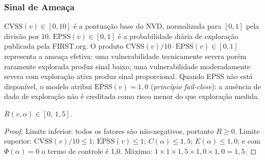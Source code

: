 \subsubsection{Sinal de Ameaça}

$\text{CVSS}(v) \in [0, 10]$ é a pontuação base do NVD, normalizada para
$[0,1]$ pela divisão por 10. $\text{EPSS}(v) \in [0, 1]$ é a probabilidade
diária de exploração publicada pela FIRST.org. O produto
$\text{CVSS}(v)/10 \cdot \text{EPSS}(v) \in [0, 1]$ representa a ameaça
efetiva: uma vulnerabilidade tecnicamente severa porém raramente explorada
produz sinal baixo; uma vulnerabilidade moderadamente severa com exploração
ativa produz sinal proporcional. Quando EPSS não está disponível, o modelo
atribui $\text{EPSS}(v) = 1{,}0$ (\emph{princípio fail-close}): a ausência
de dado de exploração não é creditada como risco menor do que exploração
medida.



\begin{proposition}
  $R(v, \alpha) \in [0,\, 1{,}5]$.
\end{proposition}

\begin{proof}
  Limite inferior: todos os fatores são não-negativos, portanto $R \geq 0$.
  Limite superior: $\text{CVSS}(v)/10 \leq 1$; $\text{EPSS}(v) \leq 1$;
  $C(\alpha) \leq 1{,}5$; $E(\alpha) \leq 1{,}0$; e com $\Phi(\alpha) = 0$
  o termo de controle é 1,0. Máximo: $1 \times 1 \times 1{,}5 \times 1{,}0
  \times 1{,}0 = 1{,}5$.
\end{proof}





